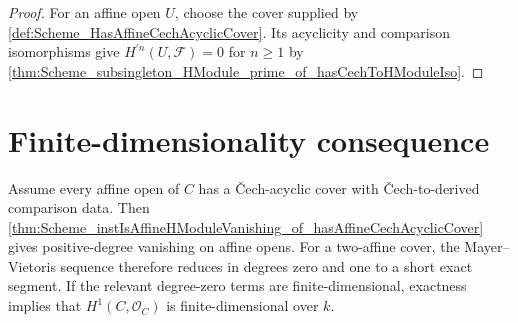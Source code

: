 \begin{proof}


\leanok
  For an affine open \(U\), choose the cover supplied by \cref{def:Scheme_HasAffineCechAcyclicCover}. Its acyclicity and comparison isomorphisms give \(H^{\prime n}(U,\mathcal F)=0\) for \(n\geq1\) by \cref{thm:Scheme_subsingleton_HModule_prime_of_hasCechToHModuleIso}.
\end{proof}

\section{Finite-dimensionality consequence}
\label{sec:mv_use_in_project}

Assume every affine open of \(C\) has a \v{C}ech-acyclic cover with \v{C}ech-to-derived comparison data. Then \cref{thm:Scheme_instIsAffineHModuleVanishing_of_hasAffineCechAcyclicCover} gives positive-degree vanishing on affine opens. For a two-affine cover, the Mayer--Vietoris sequence therefore reduces in degrees zero and one to a short exact segment. If the relevant degree-zero terms are finite-dimensional, exactness implies that \(H^1(C,\mathcal O_C)\) is finite-dimensional over \(k\).
